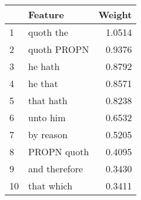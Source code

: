 \begin{tabular}{llr}
\toprule
{} &        Feature &  Weight \\
\midrule
1  &      quoth the &  1.0514 \\
2  &    quoth PROPN &  0.9376 \\
3  &        he hath &  0.8792 \\
4  &        he that &  0.8571 \\
5  &      that hath &  0.8238 \\
6  &       unto him &  0.6532 \\
7  &      by reason &  0.5205 \\
8  &    PROPN quoth &  0.4095 \\
9  &  and therefore &  0.3430 \\
10 &     that which &  0.3411 \\
\bottomrule
\end{tabular}
